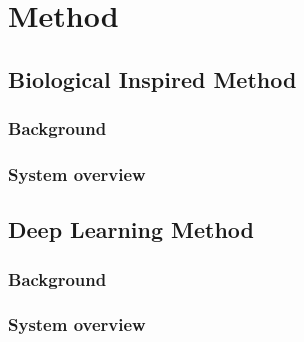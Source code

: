 \chapter{Method} \label{chap:method}

\section{Biological Inspired Method}
\subsection{Background}
\subsection{System overview}

\section{Deep Learning Method}
\subsection{Background}
\subsection{System overview}
